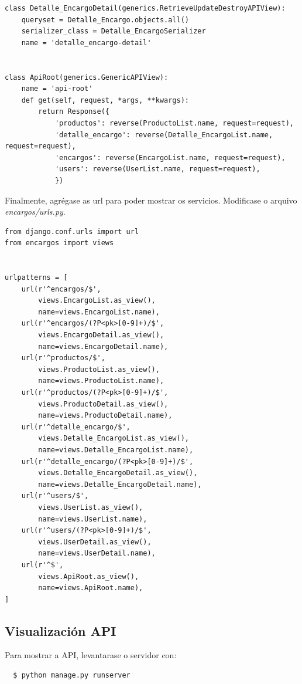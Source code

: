 \documentclass[11pt,twoside]{book}
\begin{document}
\begin{verbatim}
class Detalle_EncargoDetail(generics.RetrieveUpdateDestroyAPIView):
    queryset = Detalle_Encargo.objects.all()
    serializer_class = Detalle_EncargoSerializer
    name = 'detalle_encargo-detail'
    

class ApiRoot(generics.GenericAPIView):
    name = 'api-root'
    def get(self, request, *args, **kwargs):
        return Response({
            'productos': reverse(ProductoList.name, request=request),
            'detalle_encargo': reverse(Detalle_EncargoList.name, request=request),
            'encargos': reverse(EncargoList.name, request=request),
            'users': reverse(UserList.name, request=request),
            })
\end{verbatim}

Finalmente, agrégase as url para poder mostrar os servicios. Modificase o arquivo \textit{encargos/urls.py}.
\begin{verbatim}
from django.conf.urls import url
from encargos import views


urlpatterns = [
    url(r'^encargos/$', 
        views.EncargoList.as_view(),
        name=views.EncargoList.name),
    url(r'^encargos/(?P<pk>[0-9]+)/$', 
        views.EncargoDetail.as_view(),
        name=views.EncargoDetail.name),
    url(r'^productos/$', 
        views.ProductoList.as_view(),
        name=views.ProductoList.name),
    url(r'^productos/(?P<pk>[0-9]+)/$', 
        views.ProductoDetail.as_view(),
        name=views.ProductoDetail.name),
    url(r'^detalle_encargo/$', 
        views.Detalle_EncargoList.as_view(),
        name=views.Detalle_EncargoList.name),
    url(r'^detalle_encargo/(?P<pk>[0-9]+)/$', 
        views.Detalle_EncargoDetail.as_view(),
        name=views.Detalle_EncargoDetail.name),
    url(r'^users/$',
        views.UserList.as_view(),
        name=views.UserList.name),
    url(r'^users/(?P<pk>[0-9]+)/$',
        views.UserDetail.as_view(),
        name=views.UserDetail.name),
    url(r'^$',
        views.ApiRoot.as_view(),
        name=views.ApiRoot.name),
]
\end{verbatim}

\subsection{Visualización API}

Para mostrar a API, levantarase o servidor con:

\begin{verbatim}
  $ python manage.py runserver 
\end{verbatim}
\end{document}
